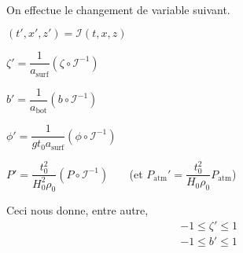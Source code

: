 \documentclass[12pt,a4paper]{article}
\numberwithin{equation}{section}
\begin{document}
    
   
    


~\\

On effectue le changement de variable suivant.

\begin{list}{\textbullet}{}
    \item $(t',x',z') = \mathcal{I} (t,x,z)$
    \item $\zeta' = \dfrac{1}{a_{\text{surf}}}(\zeta \circ \mathcal{I}^{-1})$ 
    \item $b' = \dfrac{1}{a_{\text{bot}}}(b\circ\mathcal{I}^{-1})$
     \item $\phi' = \dfrac{1}{g t_0 a_{\text{surf}}}(\phi \circ \mathcal{I}^{-1})$
     \item $P' = \dfrac{t_0^2}{H_0^2\rho_0} (P \circ \mathcal{I}^{-1})~~~~~~~$   (et $P_{\text{atm}}' = \dfrac{t_0^2}{H_0\rho_0} P_\text{atm}$)
\end{list}

Ceci nous donne, entre autre, 
\begin{align}
    &-1 \leq \zeta' \leq 1\\ &-1 \leq b' \leq 1 
\end{align}
\end{document}
